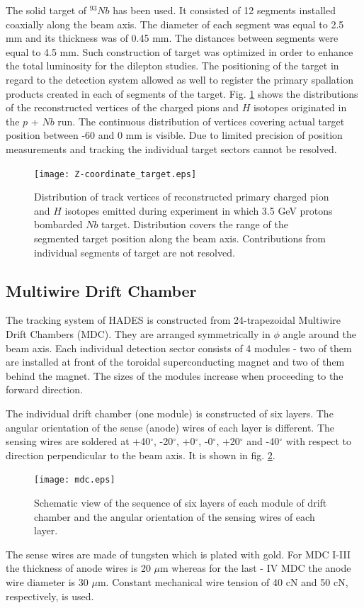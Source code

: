 The solid target of $^{93}Nb$ has been used. 
It consisted of 12 segments installed coaxially along the beam axis.
The diameter of each segment was equal to 2.5 mm and its thickness was of 0.45 mm.
The distances between segments were equal to 4.5 mm. 
Such construction of target was optimized in order to enhance the total luminosity 
for the dilepton studies. 
The positioning of the target in regard to the detection system allowed as well to register 
the primary spallation products created in each of segments of the target.
Fig. \ref{Target_reconstruction} shows the distributions of the reconstructed vertices 
of the charged pions and $H$ isotopes originated in the $p$ + $Nb$ run. The continuous distribution 
of vertices covering actual target position between -60 and 0 mm is visible. 
Due to limited precision of position measurements and tracking the individual target sectors 
cannot be resolved. 

\begin{figure}[!ht]
    \centering
    \texttt{[image: Z-coordinate\_target.eps]}
    \caption{Distribution of track vertices of reconstructed primary charged pion and $H$ isotopes 
    emitted during experiment in which 3.5 GeV protons bombarded $Nb$ target. Distribution covers the range of the segmented target
    position along the beam axis. Contributions from individual segments of target are not resolved.}
    \label{Target_reconstruction}
\end{figure}

\subsection{Multiwire Drift Chamber}
The tracking system of HADES is constructed from 24-trapezoidal Multiwire Drift Chambers (MDC). 
They are arranged symmetrically in $\phi$ angle around the beam axis. 
Each individual detection sector consists of 4 modules -  two of them are installed at front 
of the toroidal superconducting magnet and two of them behind the magnet.
The sizes of the modules increase when proceeding to the forward direction. 

The individual drift chamber (one module) is constructed of six layers. 
The angular orientation of the sense (anode) wires of each layer is different. 
The sensing wires are soldered at +40$^\circ$,  -20$^\circ$, +0$^\circ$, -0$^\circ$, +20$^\circ$ and -40$^\circ$ 
with respect to direction perpendicular to the beam axis. It is shown in fig. \ref{mdc}.   
\begin{figure}[!ht]
	\centering
	\texttt{[image: mdc.eps]}
	\caption{Schematic view of the sequence of six layers of each module of drift chamber 
	and the angular orientation of the sensing wires of each layer.}
	\label{mdc}
\end{figure}
The sense wires are made of tungsten which is plated with gold. 
For MDC I-III the thickness of anode wires is 20 $\mu$m whereas for the last - IV MDC the anode  wire diameter is 30 $\mu$m.
Constant mechanical wire tension of 40 cN and 50 cN, respectively, is used. 

